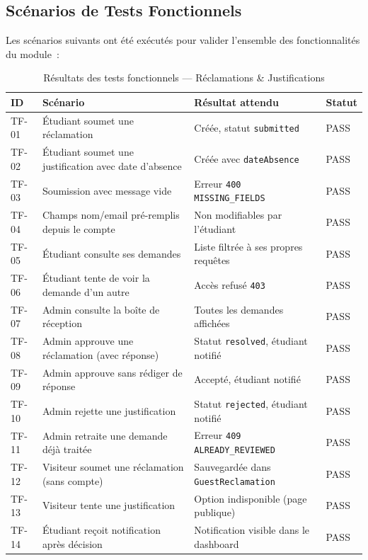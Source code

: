 \subsection{Scénarios de Tests Fonctionnels}

Les scénarios suivants ont été exécutés pour valider l'ensemble des
fonctionnalités du module~:

\begin{table}[H]
\centering
\caption{Résultats des tests fonctionnels — Réclamations \& Justifications}
\begin{tabularx}{\linewidth}{@{}lLll@{}}
\toprule
\textbf{ID} & \textbf{Scénario} & \textbf{Résultat attendu} & \textbf{Statut} \\
\midrule
TF-01 & Étudiant soumet une réclamation &
  Créée, statut \texttt{submitted} & PASS \\
TF-02 & Étudiant soumet une justification avec date d'absence &
  Créée avec \texttt{dateAbsence} & PASS \\
TF-03 & Soumission avec message vide &
  Erreur \texttt{400 MISSING\_FIELDS} & PASS \\
TF-04 & Champs nom/email pré-remplis depuis le compte &
  Non modifiables par l'étudiant & PASS \\
TF-05 & Étudiant consulte ses demandes &
  Liste filtrée à ses propres requêtes & PASS \\
TF-06 & Étudiant tente de voir la demande d'un autre &
  Accès refusé \texttt{403} & PASS \\
TF-07 & Admin consulte la boîte de réception &
  Toutes les demandes affichées & PASS \\
TF-08 & Admin approuve une réclamation (avec réponse) &
  Statut \texttt{resolved}, étudiant notifié & PASS \\
TF-09 & Admin approuve sans rédiger de réponse &
  Accepté, étudiant notifié & PASS \\
TF-10 & Admin rejette une justification &
  Statut \texttt{rejected}, étudiant notifié & PASS \\
TF-11 & Admin retraite une demande déjà traitée &
  Erreur \texttt{409 ALREADY\_REVIEWED} & PASS \\
TF-12 & Visiteur soumet une réclamation (sans compte) &
  Sauvegardée dans \texttt{GuestReclamation} & PASS \\
TF-13 & Visiteur tente une justification &
  Option indisponible (page publique) & PASS \\
TF-14 & Étudiant reçoit notification après décision &
  Notification visible dans le dashboard & PASS \\
\bottomrule
\end{tabularx}
\end{table}

